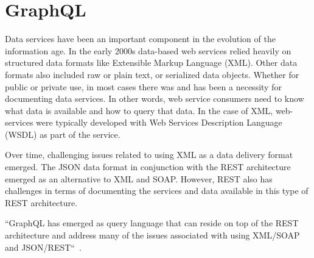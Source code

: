 \section{GraphQL}

Data services have been an important component in the evolution of the
information age.  In the early 2000s data-based web services relied
heavily on structured data formats like Extensible Markup
Language (XML).  Other data formats also included raw or plain text, or
serialized data objects.  Whether for public or private use, in most
cases there was and has been a necessity for documenting data
services.  In other words, web service consumers need to know what
data is available and how to query that data.  In the case of XML,
web-services were typically developed with
Web Services Description Language (WSDL)\cite{hid-sp18-505-WSDL2018} as part
of the service.

Over time, challenging issues related to using XML as a data delivery format
emerged.  The JSON\cite{hid-sp18-505-JSON2018} data format in
conjunction with the REST\cite{hid-sp18-505-REST2018} architecture emerged
as an alternative to XML and SOAP.  However, REST also has challenges in terms
of documenting the services and data available in this type of REST
architecture.

``GraphQL has emerged as query language that can reside on top of the REST
architecture and address many of the issues associated with using XML/SOAP and
JSON/REST``~\cite{hid-sp18-505-GraphQL2018}.
